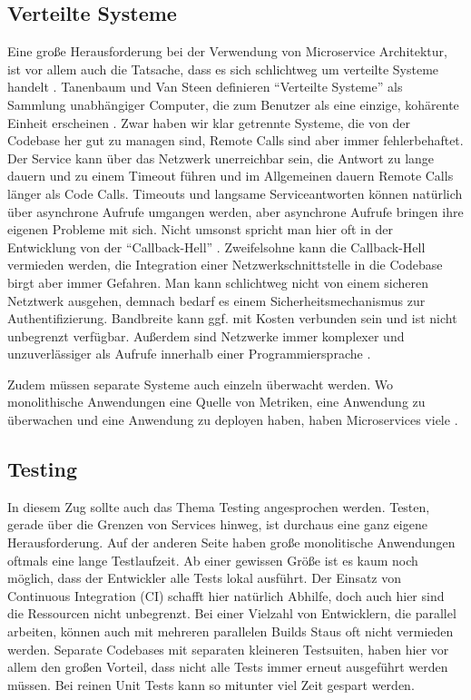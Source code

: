 \subsection{Verteilte Systeme}
Eine große Herausforderung bei der Verwendung von Microservice Architektur, ist vor allem auch die Tatsache, dass es sich schlichtweg um verteilte Systeme handelt \cite[][]{microtradeoffs}.
Tanenbaum und Van Steen definieren \enquote{Verteilte Systeme} als Sammlung unabhängiger Computer, die zum Benutzer als eine einzige, kohärente Einheit erscheinen \cite[][Seite 2]{tanenbaum2002distributed}.
Zwar haben wir klar getrennte Systeme, die von der Codebase her gut zu managen sind, Remote Calls sind aber immer fehlerbehaftet. Der Service kann über das Netzwerk unerreichbar sein, die Antwort zu lange dauern und zu einem Timeout führen und im Allgemeinen dauern Remote Calls länger als Code Calls. Timeouts und langsame Serviceantworten können natürlich über asynchrone Aufrufe umgangen werden, aber asynchrone Aufrufe bringen ihre eigenen Probleme mit sich. Nicht umsonst spricht man hier oft in der Entwicklung von der \enquote{Callback-Hell} \cite[vgl.][]{callbackhell}. Zweifelsohne kann die Callback-Hell vermieden werden, die Integration einer Netzwerkschnittstelle in die Codebase birgt aber immer Gefahren. Man kann schlichtweg nicht von einem sicheren Netztwerk ausgehen, demnach bedarf es einem Sicherheitsmechanismus zur Authentifizierung. Bandbreite kann ggf. mit Kosten verbunden sein und ist nicht unbegrenzt verfügbar. Außerdem sind Netzwerke immer komplexer und unzuverlässiger als Aufrufe innerhalb einer Programmiersprache \cite[vgl.][]{distributedfallacies}.

Zudem müssen separate Systeme auch einzeln überwacht werden. Wo monolithische Anwendungen eine Quelle von Metriken, eine Anwendung zu überwachen und eine Anwendung zu deployen haben, haben Microservices viele \cite[vgl.][]{Heroku:GoMicro}.

\subsection{Testing}
\label{section:testing}
In diesem Zug sollte auch das Thema Testing angesprochen werden. Testen, gerade über die Grenzen von Services hinweg, ist durchaus eine ganz eigene Herausforderung. Auf der anderen Seite haben große monolitische Anwendungen oftmals eine lange Testlaufzeit. Ab einer gewissen Größe ist es kaum noch möglich, dass der Entwickler alle Tests lokal ausführt. Der Einsatz von Continuous Integration (CI) schafft hier natürlich Abhilfe, doch auch hier sind die Ressourcen nicht unbegrenzt. Bei einer Vielzahl von Entwicklern, die parallel arbeiten, können auch mit mehreren parallelen Builds Staus oft nicht vermieden werden. Separate Codebases mit separaten kleineren Testsuiten, haben hier vor allem den großen Vorteil, dass nicht alle Tests immer erneut ausgeführt werden müssen. Bei reinen Unit Tests kann so mitunter viel Zeit gespart werden.


